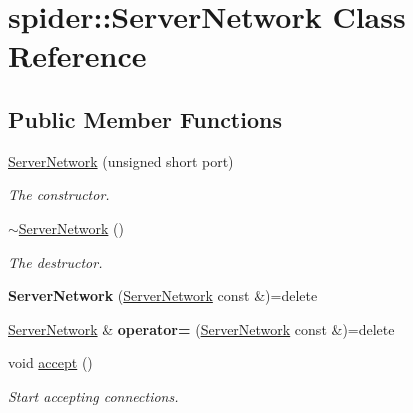 \hypertarget{classspider_1_1_server_network}{}\section{spider\+:\+:Server\+Network Class Reference}
\label{classspider_1_1_server_network}
\subsection*{Public Member Functions}
\begin{DoxyCompactItemize}
\item 
\hyperlink{classspider_1_1_server_network_af115121ee56f135db6ae6a2f9c24e6fc}{Server\+Network} (unsigned short port)
\begin{DoxyCompactList}\small\item\em The constructor. \end{DoxyCompactList}\item 
\mbox{\label{classspider_1_1_server_network_adccf2ce56686855a9566af94e2f39976}} 
\hyperlink{classspider_1_1_server_network_adccf2ce56686855a9566af94e2f39976}{$\sim$\+Server\+Network} ()
\begin{DoxyCompactList}\small\item\em The destructor. \end{DoxyCompactList}\item 
\mbox{\label{classspider_1_1_server_network_af4559a50f6d6886a51444674a3888e86}} 
{\bfseries Server\+Network} (\hyperlink{classspider_1_1_server_network}{Server\+Network} const \&)=delete
\item 
\mbox{\label{classspider_1_1_server_network_ab7276feccc0acf76b7bc0df9387a118f}} 
\hyperlink{classspider_1_1_server_network}{Server\+Network} \& {\bfseries operator=} (\hyperlink{classspider_1_1_server_network}{Server\+Network} const \&)=delete
\item 
\mbox{\label{classspider_1_1_server_network_aa1b10134b8d512368c6b607c8e3e7481}} 
void \hyperlink{classspider_1_1_server_network_aa1b10134b8d512368c6b607c8e3e7481}{accept} ()
\begin{DoxyCompactList}\small\item\em Start accepting connections. \end{DoxyCompactList}\item 

\end{DoxyCompactItemize}
